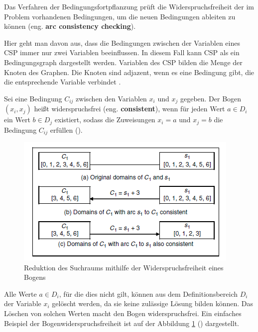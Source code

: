 Das Verfahren der Bedingungsfortpflanzung prüft die Widerspruchsfreiheit der im Problem vorhandenen Bedingungen, um die neuen Bedingungen ableiten zu können (eng. {\bf arc consistency checking}).

Hier geht man davon aus, dass die Bedingungen zwischen der Variablen eines CSP immer nur zwei Variablen beeinflussen. In diesem Fall kann CSP als ein Bedingungsgraph dargestellt werden. Variablen des CSP bilden die Menge der Knoten des Graphen. Die Knoten sind adjazent, wenn es eine Bedingung gibt, die die entsprechende Variable verbindet \citep[vgl.][]{CSP}.

Sei eine Bedingung $C_{ij}$ zwischen den Variablen $x_i$ und $x_j$ gegeben. Der Bogen $(x_i,x_j)$ heißt widerspruchsfrei (eng. {\bf consistent}), wenn für jeden Wert $a\in D_i$ ein Wert $b\in D_j$ existiert, sodass die Zuweisungen $x_i=a$ und $x_j=b$ die Bedingung $C_{ij}$ erfüllen (\cite{CSP}).

\newpage

\begin{figure}
	\vspace{-10pt}
	\vbox{
		\centering
		\includegraphics[scale=0.7]{fig/ConstraintPropagation1.png}
	}
	\caption[Reduktion des Suchraums mithilfe der Widerspruchsfreiheit eines Bogens]{Reduktion des Suchraums mithilfe der Widerspruchsfreiheit eines Bogens \citep[aus][]{CPforScheduling}}
	\label{fig:ConstraintPropagation1}
\end{figure}

Alle Werte $a\in D_i$, für die dies nicht gilt, können aus dem Definitionsbereich $D_i$ der Variable $x_i$ gelöscht werden, da sie keine zulässige Lösung bilden können. Das Löschen von solchen Werten macht den Bogen widerspruchsfrei. Ein einfaches Beispiel der Bogenwiderspruchsfreiheit ist auf der Abbildung \ref{fig:ConstraintPropagation1} (\cite{CPforScheduling}) dargestellt.

